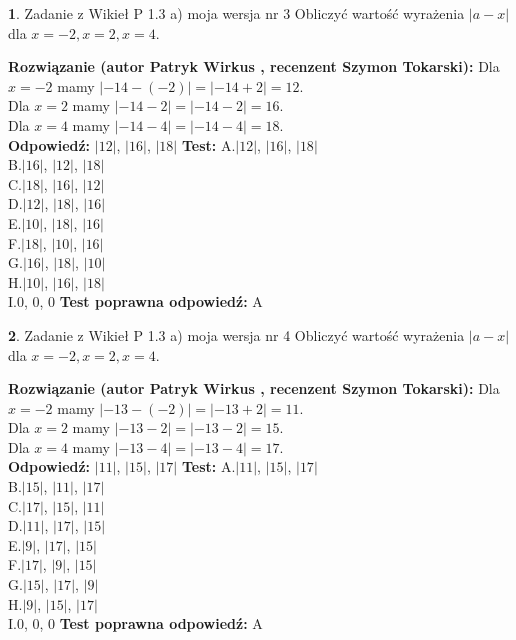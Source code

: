 \documentclass[12pt, a4paper]{article}
\theoremstyle{definition} %
\newtheorem{zad}{}
\newcommand{\zadStart}[1]{\begin{zad}#1\newline}
\newcommand{\zadStop}{\end{zad}}
\newcommand{\rozwStart}[2]{\noindent \textbf{Rozwiązanie (autor #1 , recenzent #2): }\newline}
\newcommand{\rozwStop}{\newline}
\newcommand{\odpStart}{\noindent \textbf{Odpowiedź:}\newline}
\newcommand{\odpStop}{\newline}
\newcommand{\testStart}{\noindent \textbf{Test:}\newline}
\newcommand{\testStop}{\newline}
\newcommand{\kluczStart}{\noindent \textbf{Test poprawna odpowiedź:}\newline}
\newcommand{\kluczStop}{\newline}
\begin{document}
\zadStart{Zadanie z Wikieł P 1.3 a) moja wersja nr 3}
Obliczyć wartość wyrażenia $|a - x|$ dla $x=-2,x=2,x=4$.
\zadStop
\rozwStart{Patryk Wirkus}{Szymon Tokarski}
Dla $x = -2$ mamy $|-14 - (-2)| = |-14 + 2| = 12$.\\
Dla $x = 2$ mamy $|-14 - 2| = |-14 - 2| = 16$.\\
Dla $x = 4$ mamy $|-14 - 4| = |-14 - 4| = 18$.\\
\rozwStop
\odpStart
$|12|$, $|16|$, $|18|$
\odpStop
\testStart
A.$|12|$, $|16|$, $|18|$\\
B.$|16|$, $|12|$, $|18|$\\
C.$|18|$, $|16|$, $|12|$\\
D.$|12|$, $|18|$, $|16|$\\
E.$|10|$, $|18|$, $|16|$\\
F.$|18|$, $|10|$, $|16|$\\
G.$|16|$, $|18|$, $|10|$\\
H.$|10|$, $|16|$, $|18|$\\
I.$0$, $0$, $0$
\testStop
\kluczStart
A
\kluczStop



\zadStart{Zadanie z Wikieł P 1.3 a) moja wersja nr 4}
Obliczyć wartość wyrażenia $|a - x|$ dla $x=-2,x=2,x=4$.
\zadStop
\rozwStart{Patryk Wirkus}{Szymon Tokarski}
Dla $x = -2$ mamy $|-13 - (-2)| = |-13 + 2| = 11$.\\
Dla $x = 2$ mamy $|-13 - 2| = |-13 - 2| = 15$.\\
Dla $x = 4$ mamy $|-13 - 4| = |-13 - 4| = 17$.\\
\rozwStop
\odpStart
$|11|$, $|15|$, $|17|$
\odpStop
\testStart
A.$|11|$, $|15|$, $|17|$\\
B.$|15|$, $|11|$, $|17|$\\
C.$|17|$, $|15|$, $|11|$\\
D.$|11|$, $|17|$, $|15|$\\
E.$|9|$, $|17|$, $|15|$\\
F.$|17|$, $|9|$, $|15|$\\
G.$|15|$, $|17|$, $|9|$\\
H.$|9|$, $|15|$, $|17|$\\
I.$0$, $0$, $0$
\testStop
\kluczStart
A
\kluczStop
\end{document}
